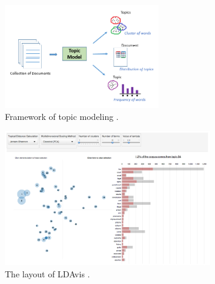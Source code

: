 \documentclass{article}
\theoremstyle{remark}
\begin{document}
\begin{figure}[!h]
\centering
\includegraphics[width=0.6\textwidth]{figures/topic_modeling.png}
\caption{\label{fig:topic_modeling}Framework of topic modeling \citep{usmani_natural_2021}.}
\end{figure}

\begin{figure}[!h]
\centering
\includegraphics[width=0.8\textwidth]{figures/ldavis.png}
\caption{\label{fig:ldavis}The layout of LDAvis \citep{sievert_ldavis_2014}.}
\end{figure}


\end{document}
